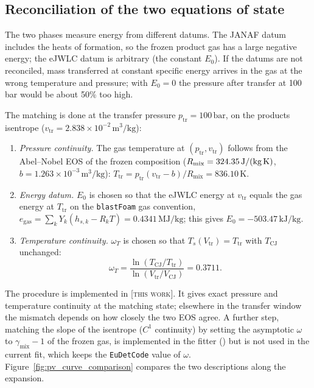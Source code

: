 \documentclass{article}
\newcommand{\tw}{\textsc{[this work]}}
\begin{document}
\subsection{Reconciliation of the two equations of state}
\label{sec:reconciliation}

The two phases measure energy from different datums. The JANAF datum includes the heats of formation, so the frozen product gas has a large negative energy; the eJWLC datum is arbitrary (the constant $E_0$). If the datums are not reconciled, mass transferred at constant specific energy arrives in the gas at the wrong temperature and pressure; with $E_0 = 0$ the pressure after transfer at 100\,bar would be about 50\% too high.

The matching is done at the transfer pressure $p_\text{tr} = 100\,\text{bar}$, on the products isentrope ($v_\text{tr} = 2.838\times10^{-2}\,\text{m}^3/\text{kg}$):
\begin{enumerate}
    \item \emph{Pressure continuity.} The gas temperature at $(p_\text{tr}, v_\text{tr})$ follows from the Abel--Nobel EOS of the frozen composition ($R_\text{mix} = 324.35\,\text{J/(kg\,K)}$, $b = 1.263\times10^{-3}\,\text{m}^3/\text{kg}$): $T_\text{tr} = p_\text{tr}(v_\text{tr} - b)/R_\text{mix} = 836.10\,\text{K}$.
    \item \emph{Energy datum.} $E_0$ is chosen so that the eJWLC energy at $v_\text{tr}$ equals the gas energy at $T_\text{tr}$ on the \texttt{blastFoam} gas convention, $e_\text{gas} = \sum_k Y_k(h_{s,k} - R_k T) = 0.4341\,\text{MJ/kg}$; this gives $E_0 = -503.47\,\text{kJ/kg}$.
    \item \emph{Temperature continuity.} $\omega_T$ is chosen so that $T_s(V_\text{tr}) = T_\text{tr}$ with $T_\text{CJ}$ unchanged:
    \begin{equation*}
        \omega_T = \frac{\ln(T_\text{CJ}/T_\text{tr})}{\ln(V_\text{tr}/V_\text{CJ})} = 0.3711.
    \end{equation*}
\end{enumerate}
The procedure is implemented in  \tw. It gives exact pressure and temperature continuity at the matching state; elsewhere in the transfer window the mismatch depends on how closely the two EOS agree. A further step, matching the slope of the isentrope ($C^1$ continuity) by setting the asymptotic $\omega$ to $\gamma_\text{mix} - 1$ of the frozen gas, is implemented in the fitter () but is not used in the current fit, which keeps the \texttt{EuDetCode} value of $\omega$. Figure~\ref{fig:pv_curve_comparison} compares the two descriptions along the expansion.
\end{document}
